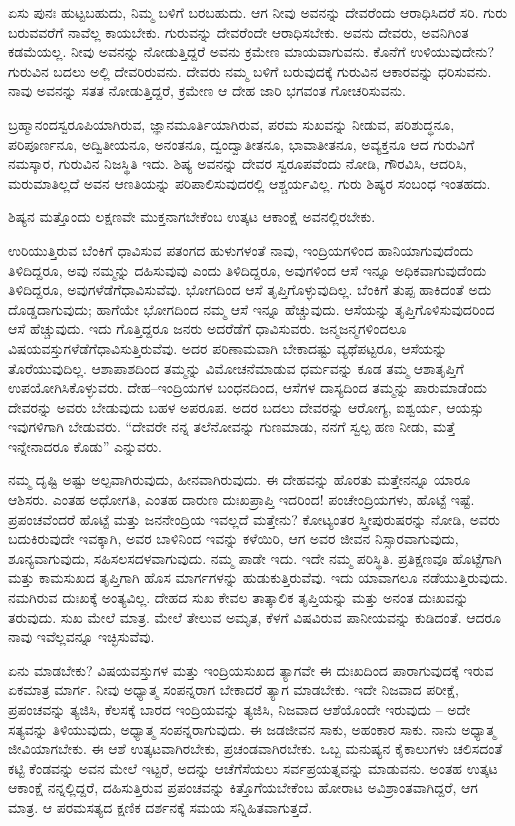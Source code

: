 ಏಸು ಪುನಃ ಹುಟ್ಟಬಹುದು, ನಿಮ್ಮ ಬಳಿಗೆ ಬರಬಹುದು. ಆಗ ನೀವು ಅವನನ್ನು ದೇವರೆಂದು ಆರಾಧಿಸಿದರೆ ಸರಿ. ಗುರು ಬರುವವರೆಗೆ ನಾವೆಲ್ಲ ಕಾಯಬೇಕು. ಗುರುವನ್ನು ದೇವರೆಂದೇ ಆರಾಧಿಸಬೇಕು. ಅವನು ದೇವರು, ಅವನಿಗಿಂತ ಕಡಮೆಯಲ್ಲ. ನೀವು ಅವನನ್ನು ನೋಡುತ್ತಿದ್ದರೆ ಅವನು ಕ್ರಮೇಣ ಮಾಯವಾಗುವನು. ಕೊನೆಗೆ ಉಳಿಯುವುದೇನು? ಗುರುವಿನ ಬದಲು ಅಲ್ಲಿ ದೇವರಿರುವನು. ದೇವರು ನಮ್ಮ ಬಳಿಗೆ ಬರುವುದಕ್ಕೆ ಗುರುವಿನ ಆಕಾರವನ್ನು ಧರಿಸುವನು. ನಾವು ಅವನನ್ನು ಸತತ ನೋಡುತ್ತಿದ್ದರೆ, ಕ್ರಮೇಣ ಆ ದೇಹ ಜಾರಿ ಭಗವಂತ ಗೋಚರಿಸುವನು.

ಬ್ರಹ್ಮಾನಂದಸ್ವರೂಪಿಯಾಗಿರುವ, ಜ್ಞಾನಮೂರ್ತಿಯಾಗಿರುವ, ಪರಮ ಸುಖವನ್ನು ನೀಡುವ, ಪರಿಶುದ್ಧನೂ, ಪರಿಪೂರ್ಣನೂ, ಅದ್ವಿತೀಯನೂ, ಅನಂತನೂ, ದ್ವಂದ್ವಾತೀತನೂ, ಭಾವಾತೀತನೂ, ಅವ್ಯಕ್ತನೂ ಆದ ಗುರುವಿಗೆ ನಮಸ್ಕಾರ, ಗುರುವಿನ ನಿಜಸ್ಥಿತಿ ಇದು. ಶಿಷ್ಯ ಅವನನ್ನು ದೇವರ ಸ್ವರೂಪವೆಂದು ನೋಡಿ, ಗೌರವಿಸಿ, ಆದರಿಸಿ, ಮರುಮಾತಿಲ್ಲದೆ ಅವನ ಆಣತಿಯನ್ನು ಪರಿಪಾಲಿಸುವುದರಲ್ಲಿ ಆಶ್ಚರ್ಯವಿಲ್ಲ. ಗುರು ಶಿಷ್ಯರ ಸಂಬಂಧ ಇಂತಹದು.

ಶಿಷ್ಯನ ಮತ್ತೊಂದು ಲಕ್ಷಣವೇ ಮುಕ್ತನಾಗಬೇಕೆಂಬ ಉತ್ಕಟ ಆಕಾಂಕ್ಷೆ ಅವನಲ್ಲಿರಬೇಕು.

ಉರಿಯುತ್ತಿರುವ ಬೆಂಕಿಗೆ ಧಾವಿಸುವ ಪತಂಗದ ಹುಳುಗಳಂತೆ ನಾವು, ಇಂದ್ರಿಯಗಳಿಂದ ಹಾನಿಯಾಗುವುದೆಂದು ತಿಳಿದಿದ್ದರೂ, ಅವು ನಮ್ಮನ್ನು ದಹಿಸುವುವು ಎಂದು ತಿಳಿದಿದ್ದರೂ, ಅವುಗಳಿಂದ ಆಸೆ ಇನ್ನೂ ಅಧಿಕವಾಗುವುದೆಂದು ತಿಳಿದಿದ್ದರೂ, ಅವುಗಳೆಡೆಗೆ\break ಧಾವಿಸುವೆವು. ಭೋಗದಿಂದ ಆಸೆ ತೃಪ್ತಿಗೊಳ್ಳುವುದಿಲ್ಲ. ಬೆಂಕಿಗೆ ತುಪ್ಪ ಹಾಕಿದಂತೆ ಅದು ದೊಡ್ಡದಾಗುವುದು; ಹಾಗೆಯೇ ಭೋಗದಿಂದ ನಮ್ಮ ಆಸೆ ಇನ್ನೂ ಹೆಚ್ಚುವುದು. ಆಸೆಯನ್ನು ತೃಪ್ತಿಗೊಳಿಸುವುದರಿಂದ ಆಸೆ ಹೆಚ್ಚುವುದು. ಇದು ಗೊತ್ತಿದ್ದರೂ ಜನರು ಅದರೆಡೆಗೆ ಧಾವಿಸುವರು. ಜನ್ಮಜನ್ಮಗಳಿಂದಲೂ ವಿಷಯವಸ್ತುಗಳೆಡೆಗೆ\break ಧಾವಿಸುತ್ತಿರುವೆವು. ಅದರ ಪರಿಣಾಮವಾಗಿ ಬೇಕಾದಷ್ಟು ವ್ಯಥೆಪಟ್ಟರೂ, ಆಸೆಯನ್ನು ತೊರೆಯುವುದಿಲ್ಲ. ಆಶಾಪಾಶದಿಂದ ತಮ್ಮನ್ನು ವಿಮೋಚನೆಮಾಡುವ ಧರ್ಮವನ್ನು ಕೂಡ ತಮ್ಮ ಆಶಾತೃಪ್ತಿಗೆ ಉಪಯೋಗಿಸಿಕೊಳ್ಳುವರು. ದೇಹ–ಇಂದ್ರಿಯಗಳ ಬಂಧನದಿಂದ, ಆಸೆಗಳ ದಾಸ್ಯದಿಂದ ತಮ್ಮನ್ನು ಪಾರುಮಾಡೆಂದು ದೇವರನ್ನು ಅವರು ಬೇಡುವುದು ಬಹಳ ಅಪರೂಪ. ಅದರ ಬದಲು ದೇವರನ್ನು ಆರೋಗ್ಯ, ಐಶ್ವರ್ಯ, ಆಯಸ್ಸು ಇವುಗಳಿಗಾಗಿ ಬೇಡುವರು. “ದೇವರೇ ನನ್ನ ತಲೆನೋವನ್ನು ಗುಣಮಾಡು, ನನಗೆ ಸ್ವಲ್ಪ ಹಣ ನೀಡು, ಮತ್ತೆ ಇನ್ನೇನಾದರೂ ಕೊಡು'' ಎನ್ನುವರು.

ನಮ್ಮ ದೃಷ್ಟಿ ಅಷ್ಟು ಅಲ್ಪವಾಗಿರುವುದು, ಹೀನವಾಗಿರುವುದು. ಈ ದೇಹವನ್ನು ಹೊರತು ಮತ್ತೇನನ್ನೂ ಯಾರೂ ಆಶಿಸರು. ಎಂತಹ ಅಧೋಗತಿ, ಎಂತಹ ದಾರುಣ ದುಃಖಪ್ರಾಪ್ತಿ ಇದರಿಂದ! ಪಂಚೇಂದ್ರಿಯಗಳು, ಹೊಟ್ಟೆ ಇಷ್ಟೆ. ಪ್ರಪಂಚವೆಂದರೆ ಹೊಟ್ಟೆ ಮತ್ತು ಜನನೇಂದ್ರಿಯ ಇವಲ್ಲದೆ ಮತ್ತೇನು? ಕೋಟ್ಯಂತರ ಸ್ತ್ರೀಪುರುಷರನ್ನು ನೋಡಿ, ಅವರು ಬದುಕಿರುವುದೇ ಇವಕ್ಕಾಗಿ, ಅವರ ಬಾಳಿನಿಂದ ಇವನ್ನು ಕಳೆಯಿರಿ, ಆಗ ಅವರ ಜೀವನ ನಿಸ್ಸಾರವಾಗುವುದು, ಶೂನ್ಯವಾಗುವುದು, ಸಹಿಸಲಸದಳವಾಗುವುದು. ನಮ್ಮ ಪಾಡೇ ಇದು. ಇದೇ ನಮ್ಮ ಪರಿಸ್ಥಿತಿ. ಪ್ರತಿಕ್ಷಣವೂ ಹೊಟ್ಟೆಗಾಗಿ ಮತ್ತು ಕಾಮಸುಖದ ತೃಪ್ತಿಗಾಗಿ ಹೊಸ ಮಾರ್ಗಗಳನ್ನು ಹುಡುಕುತ್ತಿರುವೆವು. ಇದು ಯಾವಾಗಲೂ ನಡೆಯುತ್ತಿರುವುದು. ನಮಗಿರುವ ದುಃಖಕ್ಕೆ ಅಂತ್ಯವಿಲ್ಲ. ದೇಹದ ಸುಖ ಕೇವಲ ತಾತ್ಕಾಲಿಕ ತೃಪ್ತಿಯನ್ನು ಮತ್ತು ಅನಂತ ದುಃಖವನ್ನು ತರುವುದು. ಸುಖ ಮೇಲೆ ಮಾತ್ರ. ಮೇಲೆ ತೇಲುವ ಅಮೃತ, ಕೆಳಗೆ ವಿಷವಿರುವ ಪಾನೀಯವನ್ನು ಕುಡಿದಂತೆ. ಆದರೂ ನಾವು ಇವೆಲ್ಲವನ್ನೂ ಇಚ್ಛಿಸುವೆವು.

ಏನು ಮಾಡಬೇಕು? ವಿಷಯವಸ್ತುಗಳ ಮತ್ತು ಇಂದ್ರಿಯಸುಖದ ತ್ಯಾಗವೇ ಈ ದುಃಖದಿಂದ ಪಾರಾಗುವುದಕ್ಕೆ ಇರುವ ಏಕಮಾತ್ರ ಮಾರ್ಗ. ನೀವು ಅಧ್ಯಾತ್ಮ ಸಂಪನ್ನರಾಗ ಬೇಕಾದರೆ ತ್ಯಾಗ ಮಾಡಬೇಕು. ಇದೇ ನಿಜವಾದ ಪರೀಕ್ಷೆ, ಪ್ರಪಂಚವನ್ನು ತ್ಯಜಿಸಿ, ಕೆಲಸಕ್ಕೆ ಬಾರದ ಇಂದ್ರಿಯವನ್ನು ತ್ಯಜಿಸಿ, ನಿಜವಾದ ಆಶೆಯೊಂದೇ ಇರುವುದು – ಅದೇ ಸತ್ಯವನ್ನು ತಿಳಿಯುವುದು, ಅಧ್ಯಾತ್ಮ ಸಂಪನ್ನರಾಗುವುದು. ಈ ಜಡಜೀವನ ಸಾಕು, ಅಹಂಕಾರ ಸಾಕು. ನಾನು ಅಧ್ಯಾತ್ಮ ಜೀವಿಯಾಗಬೇಕು. ಈ ಆಶೆ ಉತ್ಕಟವಾಗಿರಬೇಕು, ಪ್ರಚಂಡವಾಗಿರಬೇಕು. ಒಬ್ಬ ಮನುಷ್ಯನ ಕೈಕಾಲುಗಳು ಚಲಿಸದಂತೆ ಕಟ್ಟಿ ಕೆಂಡವನ್ನು ಅವನ ಮೇಲೆ ಇಟ್ಟರೆ, ಅದನ್ನು ಆಚೆಗೆಸೆಯಲು ಸರ್ವಪ್ರಯತ್ನವನ್ನು ಮಾಡುವನು. ಅಂತಹ ಉತ್ಕಟ ಆಕಾಂಕ್ಷೆ ನನ್ನಲ್ಲಿದ್ದರೆ, ದಹಿಸುತ್ತಿರುವ ಪ್ರಪಂಚವನ್ನು ಕಿತ್ತೊಗೆಯಬೇಕೆಂಬ ಹೋರಾಟ ಅವಿಶ್ರಾಂತವಾಗಿದ್ದರೆ, ಆಗ ಮಾತ್ರ. ಆ ಪರಮಸತ್ಯದ ಕ್ಷಣಿಕ ದರ್ಶನಕ್ಕೆ ಸಮಯ ಸನ್ನಿಹಿತವಾಗುತ್ತದೆ.

